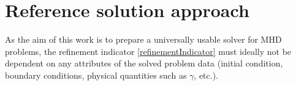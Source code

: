 \section{Reference solution approach}
As the aim of this work is to prepare a universally usable solver for MHD problems, the refinement indicator \ref{refinementIndicator} must ideally not be dependent on any attributes of the solved problem data (initial condition, boundary conditions, physical quantities such as $\gamma$, etc.).
